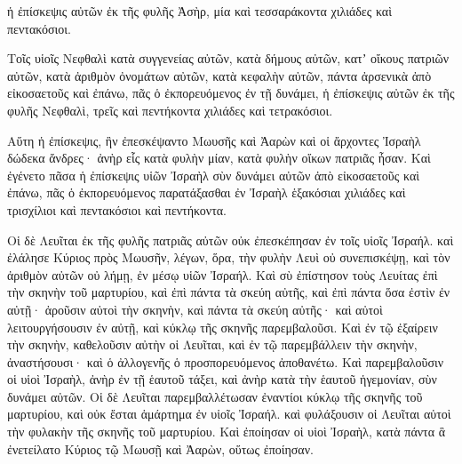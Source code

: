 {ἡ ἐπίσκεψις αὐτῶν ἐκ τῆς φυλῆς Ἀσὴρ, μία καὶ τεσσαράκοντα χιλιάδες καὶ πεντακόσιοι.
\par }{\PP {}Τοῖς υἱοῖς Νεφθαλὶ κατὰ συγγενείας αὐτῶν, κατὰ δήμους αὐτῶν, κατʼ οἴκους πατριῶν αὐτῶν, κατὰ ἀριθμὸν ὀνομάτων αὐτῶν, κατὰ κεφαλὴν αὐτῶν, πάντα ἀρσενικὰ ἀπὸ εἰκοσαετοῦς καὶ ἐπάνω, πᾶς ὁ ἐκπορευόμενος ἐν τῇ δυνάμει,
ἡ ἐπίσκεψις αὐτῶν ἐκ τῆς φυλῆς Νεφθαλὶ, τρεῖς καὶ πεντήκοντα χιλιάδες καὶ τετρακόσιοι.
\par }{\PP {}Αὕτη ἡ ἐπίσκεψις, ἣν ἐπεσκέψαντο Μωυσῆς καὶ Ἀαρὼν καὶ οἱ ἄρχοντες Ἰσραὴλ δώδεκα ἄνδρες· ἀνὴρ εἷς κατὰ φυλὴν μίαν, κατὰ φυλὴν οἴκων πατριᾶς ἦσαν.
Καὶ ἐγένετο πᾶσα ἡ ἐπίσκεψις υἱῶν Ἰσραὴλ σὺν δυνάμει αὐτῶν ἀπὸ εἰκοσαετοῦς καὶ ἐπάνω, πᾶς ὁ ἐκπορευόμενος παρατάξασθαι ἐν Ἰσραὴλ
ἑξακόσιαι χιλιάδες καὶ τρισχίλιοι καὶ πεντακόσιοι καὶ πεντήκοντα.
\par }{\PP {}Οἱ δὲ Λευῖται ἐκ τῆς φυλῆς πατριᾶς αὐτῶν οὐκ ἐπεσκέπησαν ἐν τοῖς υἱοῖς Ἰσραήλ.
καὶ ἐλάλησε Κύριος πρὸς Μωυσῆν, λέγων,
ὅρα, τὴν φυλὴν Λευὶ οὐ συνεπισκέψῃ, καὶ τὸν ἀριθμὸν αὐτῶν οὐ λήμῃ, ἐν μέσῳ υἱῶν Ἰσραήλ.
Καὶ σὺ ἐπίστησον τοὺς Λευίτας ἐπὶ τὴν σκηνὴν τοῦ μαρτυρίου, καὶ ἐπὶ πάντα τὰ σκεύη αὐτῆς, καὶ ἐπὶ πάντα ὅσα ἐστὶν ἐν αὐτῇ· ἀροῦσιν αὐτοὶ τὴν σκηνὴν, καὶ πάντα τὰ σκεύη αὐτῆς· καὶ αὐτοὶ λειτουργήσουσιν ἐν αὐτῇ, καὶ κύκλῳ τῆς σκηνῆς παρεμβαλοῦσι.
Καὶ ἐν τῷ ἐξαίρειν τὴν σκηνὴν, καθελοῦσιν αὐτὴν οἱ Λευῖται, καὶ ἐν τῷ παρεμβάλλειν τὴν σκηνὴν, ἀναστήσουσι· καὶ ὁ ἀλλογενῆς ὁ προσπορευόμενος ἀποθανέτω.
Καὶ παρεμβαλοῦσιν οἱ υἱοὶ Ἰσραὴλ, ἀνὴρ ἐν τῇ ἑαυτοῦ τάξει, καὶ ἀνὴρ κατὰ τὴν ἑαυτοῦ ἡγεμονίαν, σὺν δυνάμει αὐτῶν.
Οἱ δὲ Λευῖται παρεμβαλλέτωσαν ἐναντίοι κύκλῳ τῆς σκηνῆς τοῦ μαρτυρίου, καὶ οὐκ ἔσται ἁμάρτημα ἐν υἱοῖς Ἰσραήλ. καὶ φυλάξουσιν οἱ Λευῖται αὐτοὶ τὴν φυλακὴν τῆς σκηνῆς τοῦ μαρτυρίου.
Καὶ ἐποίησαν οἱ υἱοὶ Ἰσραὴλ, κατὰ πάντα ἃ ἐνετείλατο Κύριος τῷ Μωυσῇ καὶ Ἀαρὼν, οὕτως ἐποίησαν.

}
